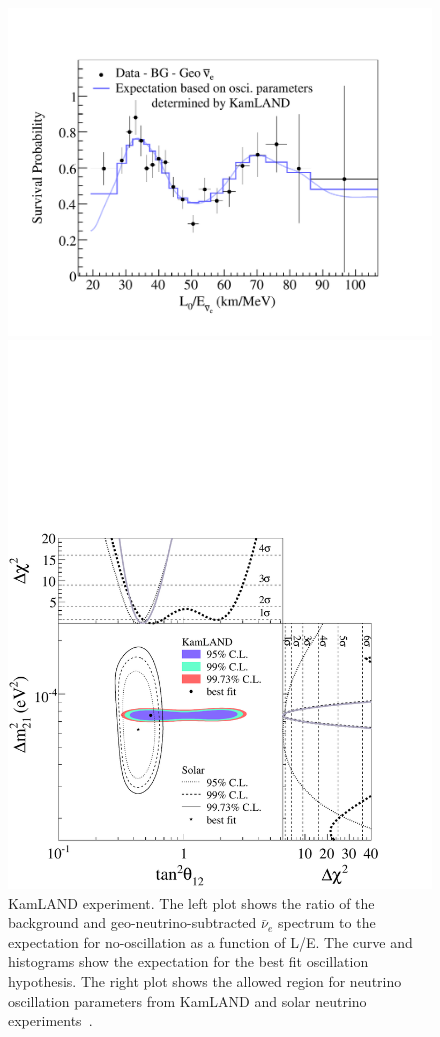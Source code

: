 \begin{figure}[htbp]
\begin{minipage}[c]{.46\linewidth}
   	      \includegraphics[width=0.9\linewidth]{figures/LE.pdf}
   \end{minipage} \hfill
   \begin{minipage}{.46\linewidth}
      \includegraphics[width=0.9\linewidth]{figures/KShape-and-Rate-Tan.pdf}
   \end{minipage}
    \caption{KamLAND experiment. The left plot shows the ratio of the background and geo-neutrino-subtracted $\bar{\nu}_e$
spectrum to the expectation for no-oscillation as a function of
L/E. The curve and histograms show the expectation for the best fit oscillation hypothesis. The right plot shows the allowed region for neutrino oscillation parameters from
KamLAND and solar neutrino experiments~\cite{kamland}.}
 \label{fig:sol-kam}
\end{figure}


